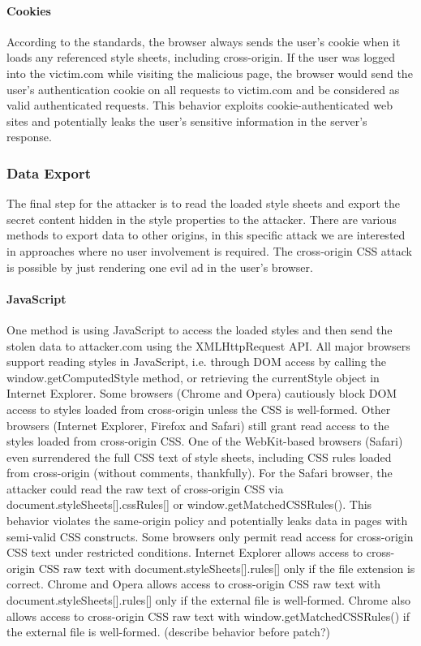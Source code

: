 \documentclass{acm_proc_article-sp}
\begin{document}
\paragraph{Cookies}
According to the standards, the browser always sends the user's cookie when it loads any referenced style sheets, including cross-origin. If the user was logged into the victim.com while visiting the malicious page, the browser would send the user's authentication cookie on all requests to victim.com and be considered as valid authenticated requests. This behavior exploits cookie-authenticated web sites and potentially leaks the user's sensitive information in the server's response. 

\subsubsection{Data Export}
The final step for the attacker is to read the loaded style sheets and export the secret content hidden in the style properties to the attacker. There are various methods to export data to other origins, in this specific attack we are interested in approaches where no user involvement is required. The cross-origin CSS attack is possible by just rendering one evil ad in the user's browser. 

\paragraph{JavaScript}
One method is using JavaScript to access the loaded styles and then send the stolen data to attacker.com using the XMLHttpRequest API. All major browsers support reading styles in JavaScript, i.e. through DOM access by calling the window.getComputedStyle method, or retrieving the currentStyle object in Internet Explorer. Some browsers (Chrome and Opera) cautiously block DOM access to styles loaded from cross-origin unless the CSS is well-formed. Other browsers (Internet Explorer, Firefox and Safari) still grant read access to the styles loaded from cross-origin CSS. One of the WebKit-based browsers (Safari) even surrendered the full CSS text of style sheets, including CSS rules loaded from cross-origin (without comments, thankfully). For the Safari browser, the attacker could read the raw text of cross-origin CSS via document.styleSheets[].cssRules[] or window.getMatchedCSSRules(). This behavior violates the same-origin policy and potentially leaks data in pages with semi-valid CSS constructs. Some browsers only permit read access for cross-origin CSS text under restricted conditions. Internet Explorer allows access to cross-origin CSS raw text with document.styleSheets[].rules[] only if the file extension is correct. Chrome and Opera allows access to cross-origin CSS raw text with document.styleSheets[].rules[] only if the external file is well-formed. Chrome also allows access to cross-origin CSS raw text with window.getMatchedCSSRules() if the external file is well-formed.
(describe behavior before patch?)
\end{document}
